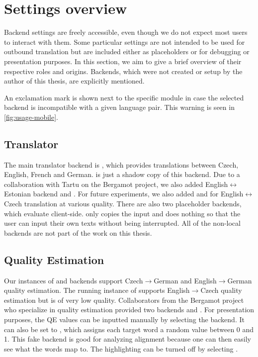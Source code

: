 \section{Settings overview}
\label{sec:usage-settings}

Backend settings are freely accessible, even though we do not expect most users to interact with them. Some particular settings are not intended to be used for outbound translation but are included either as placeholders or for debugging or presentation purposes. In this section, we aim to give a brief overview of their respective roles and origins. Backends, which were not created or setup by the author of this thesis, are explicitly mentioned.

An exclamation mark is shown next to the specific module in case the selected backend is incompatible with a given language pair. This warning is seen in \cref{fig:usage-mobile}.

\subsection*{Translator}

The main translator backend is  \citep{popel-en-cs}, which provides translations between Czech, English, French and German.  is just a shadow copy of this backend. Due to a collaboration with Tartu on the Bergamot project, we also added English$\leftrightarrow$Estonian backend  and . For future experiments, we also added  and  for English$\leftrightarrow$Czech translation at various quality. There are also two placeholder backends, which evaluate client-side.  only copies the input and  does nothing so that the user can input their own texts without being interrupted. All of the non-local backends are not part of the work on this thesis.

\subsection*{Quality Estimation}

Our instances of  and  backends support Czech$\rightarrow$German and English$\rightarrow$German quality estimation. The running instance of  supports English$\rightarrow$Czech quality estimation but is of very low quality. Collaborators from the Bergamot project who specialize in quality estimation provided two backends  and . For presentation purposes, the QE values can be inputted manually by selecting the  backend. It can also be set to , which assigns each target word a random value between 0 and 1. This fake backend is good for analyzing alignment because one can then easily see what the words map to. The highlighting can be turned off by selecting .

